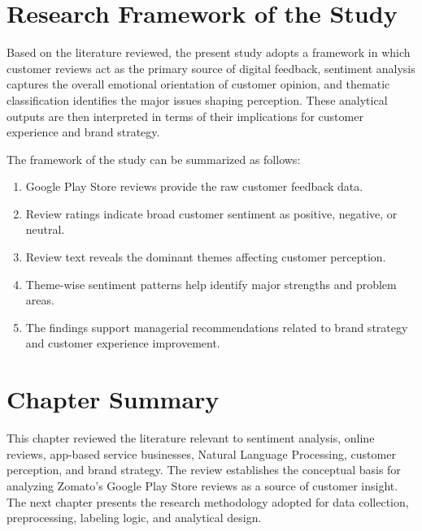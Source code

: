 \section{Research Framework of the Study}

Based on the literature reviewed, the present study adopts a framework in which customer reviews act as the primary source of digital feedback, sentiment analysis captures the overall emotional orientation of customer opinion, and thematic classification identifies the major issues shaping perception. These analytical outputs are then interpreted in terms of their implications for customer experience and brand strategy.

The framework of the study can be summarized as follows:

\begin{enumerate}[label=\arabic*.]
    \item Google Play Store reviews provide the raw customer feedback data.
    \item Review ratings indicate broad customer sentiment as positive, negative, or neutral.
    \item Review text reveals the dominant themes affecting customer perception.
    \item Theme-wise sentiment patterns help identify major strengths and problem areas.
    \item The findings support managerial recommendations related to brand strategy and customer experience improvement.
\end{enumerate}

\section{Chapter Summary}

This chapter reviewed the literature relevant to sentiment analysis, online reviews, app-based service businesses, Natural Language Processing, customer perception, and brand strategy. The review establishes the conceptual basis for analyzing Zomato's Google Play Store reviews as a source of customer insight. The next chapter presents the research methodology adopted for data collection, preprocessing, labeling logic, and analytical design.
